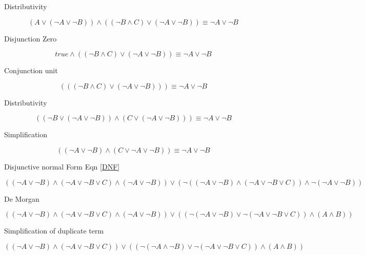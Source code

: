 \documentclass[10pt,a4paper]{article}
\begin{document}
Distributivity

\begin{equation}
(A \vee (\neg A \vee\neg B))\wedge((\neg B \wedge C) \vee (\neg A \vee \neg B)) \equiv \neg A \vee \neg B
\end{equation}

Disjunction Zero

\begin{equation}
true \wedge((\neg B \wedge C) \vee (\neg A \vee \neg B)) \equiv \neg A \vee \neg B
\end{equation}

Conjunction unit

\begin{equation}
(((\neg B \wedge C) \vee (\neg A \vee \neg B))) \equiv \neg A \vee \neg B
\end{equation}

Distributivity

\begin{equation}
((\neg B \vee (\neg A \vee \neg B ))\wedge(C \vee (\neg A \vee \neg B))) \equiv \neg A \vee \neg B
\end{equation}

Simplification

\begin{equation}
((\neg A \vee \neg B )\wedge(C \vee \neg A \vee \neg B)) \equiv \neg A \vee \neg B
\end{equation}

Disjunctive normal Form Eqn \ref{DNF}

\begin{equation}
 ((\neg A \vee \neg B) \wedge(\neg A\vee\neg B\vee C) \wedge(\neg A\vee\neg B)) \vee (\neg ((\neg A\vee \neg B)\wedge(\neg A\vee\neg B\vee C))\wedge\neg(\neg A\vee \neg B))
\end{equation}

De Morgan

\begin{equation}
 ((\neg A \vee \neg B) \wedge(\neg A\vee\neg B\vee C) \wedge(\neg A\vee\neg B)) \vee ((\neg(\neg A\vee \neg B)\vee\neg(\neg A\vee\neg B\vee C))\wedge(A\wedge B))
\end{equation}

Simplification of duplicate term

\begin{equation}
 ((\neg A \vee \neg B) \wedge(\neg A\vee\neg B\vee C)) \vee ((\neg(\neg A\wedge \neg B)\vee\neg(\neg A\vee\neg B\vee C))\wedge(A\wedge B))
\end{equation}
\end{document}
